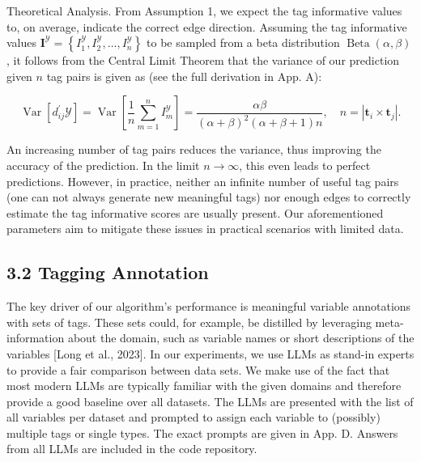 \documentclass[10pt]{article}
\begin{document}
Theoretical Analysis. From Assumption 1, we expect the tag informative values to, on average, indicate the correct edge direction. Assuming the tag informative values $\mathbf{I}^{\mathcal{Y}}=\left\{I_{1}^{\mathcal{Y}}, I_{2}^{\mathcal{Y}}, \ldots, I_{n}^{\mathcal{Y}}\right\}$ to be sampled from a beta distribution $\operatorname{Beta}(\alpha, \beta)$, it follows from the Central Limit Theorem that the variance of our prediction given $n$ tag pairs is given as (see the full derivation in App. A):


\begin{equation*}
\operatorname{Var}\left[d_{i j}^{\prime} \mathcal{Y}\right]=\operatorname{Var}\left[\frac{1}{n} \sum_{m=1}^{n} I_{m}^{\mathcal{Y}}\right]=\frac{\alpha \beta}{(\alpha+\beta)^{2}(\alpha+\beta+1) n}, \quad n=\left|\mathbf{t}_{i} \times \mathbf{t}_{j}\right| . \tag{6}
\end{equation*}


An increasing number of tag pairs reduces the variance, thus improving the accuracy of the prediction. In the limit $n \rightarrow \infty$, this even leads to perfect predictions. However, in practice, neither an infinite number of useful tag pairs (one can not always generate new meaningful tags) nor enough edges to correctly estimate the tag informative scores are usually present. Our aforementioned parameters aim to mitigate these issues in practical scenarios with limited data.

\subsection*{3.2 Tagging Annotation}
The key driver of our algorithm's performance is meaningful variable annotations with sets of tags. These sets could, for example, be distilled by leveraging meta-information about the domain, such as variable names or short descriptions of the variables [Long et al., 2023]. In our experiments, we use LLMs as stand-in experts to provide a fair comparison between data sets. We make use of the fact that most modern LLMs are typically familiar with the given domains and therefore provide a good baseline over all datasets. The LLMs are presented with the list of all variables per dataset and prompted to assign each variable to (possibly) multiple tags or single types. The exact prompts are given in App. D. Answers from all LLMs are included in the code repository.
\end{document}
